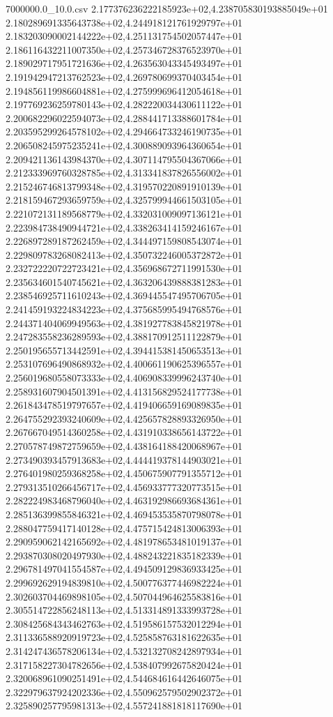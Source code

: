 \begin{filecontents*}{7000000.0_10.0.csv}
2.177376236222185923e+02,4.238705830193885049e+01
2.180289691335643738e+02,4.244918121761929797e+01
2.183203090002144222e+02,4.251131754502057447e+01
2.186116432211007350e+02,4.257346728376523970e+01
2.189029717951721636e+02,4.263563043345493497e+01
2.191942947213762523e+02,4.269780699370403454e+01
2.194856119986604881e+02,4.275999696412054618e+01
2.197769236259780143e+02,4.282220034430611122e+01
2.200682296022594073e+02,4.288441713388601784e+01
2.203595299264578102e+02,4.294664733246190735e+01
2.206508245975235241e+02,4.300889093964360654e+01
2.209421136143984370e+02,4.307114795504367066e+01
2.212333969760328785e+02,4.313341837826556002e+01
2.215246746813799348e+02,4.319570220891910139e+01
2.218159467293659759e+02,4.325799944661503105e+01
2.221072131189568779e+02,4.332031009097136121e+01
2.223984738490944721e+02,4.338263414159246167e+01
2.226897289187262459e+02,4.344497159808543074e+01
2.229809783268082413e+02,4.350732246005372872e+01
2.232722220722723421e+02,4.356968672711991530e+01
2.235634601540745621e+02,4.363206439888381283e+01
2.238546925711610243e+02,4.369445547495706705e+01
2.241459193224834223e+02,4.375685995494768576e+01
2.244371404069949563e+02,4.381927783845821978e+01
2.247283558236289593e+02,4.388170912511122879e+01
2.250195655713442591e+02,4.394415381450653513e+01
2.253107696490868932e+02,4.400661190625396557e+01
2.256019680558073333e+02,4.406908339996243740e+01
2.258931607904501391e+02,4.413156829524177738e+01
2.261843478519797657e+02,4.419406659169089835e+01
2.264755292393240609e+02,4.425657828893326950e+01
2.267667049514360258e+02,4.431910338656143722e+01
2.270578749872759659e+02,4.438164188420068967e+01
2.273490393457913683e+02,4.444419378144903021e+01
2.276401980259368258e+02,4.450675907791355712e+01
2.279313510266456717e+02,4.456933777320773515e+01
2.282224983468796040e+02,4.463192986693684361e+01
2.285136399855846321e+02,4.469453535870798078e+01
2.288047759417140128e+02,4.475715424813006393e+01
2.290959062142165692e+02,4.481978653481019137e+01
2.293870308020497930e+02,4.488243221835182339e+01
2.296781497041554587e+02,4.494509129836933425e+01
2.299692629194839810e+02,4.500776377446982224e+01
2.302603704469898105e+02,4.507044964625583816e+01
2.305514722856248113e+02,4.513314891333993728e+01
2.308425684343462763e+02,4.519586157532012294e+01
2.311336588920919723e+02,4.525858763181622635e+01
2.314247436578206134e+02,4.532132708242897934e+01
2.317158227304782656e+02,4.538407992675820424e+01
2.320068961090251491e+02,4.544684616442646075e+01
2.322979637924202336e+02,4.550962579502902372e+01
2.325890257795981313e+02,4.557241881818117690e+01

\end{filecontents*}
